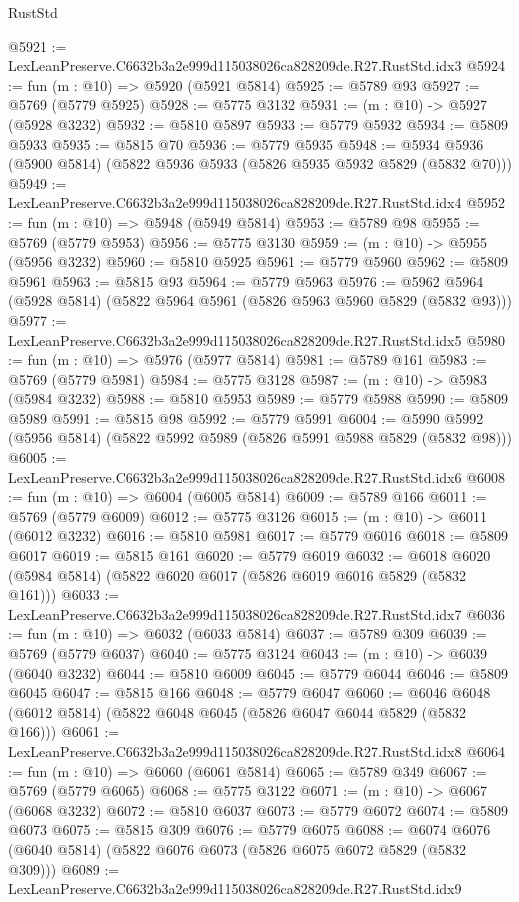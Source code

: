 \begin{lexlean}{RustStd}
\begin{coremodule}
@5921 := LexLeanPreserve.C6632b3a2e999d115038026ca828209de.R27.RustStd.idx3
@5924 := fun (m : @10) => @5920 (@5921 @5814)
@5925 := @5789 @93
@5927 := @5769 (@5779 @5925)
@5928 := @5775 @3132
@5931 := (m : @10) -> @5927 (@5928 @3232)
@5932 := @5810 @5897
@5933 := @5779 @5932
@5934 := @5809 @5933
@5935 := @5815 @70
@5936 := @5779 @5935
@5948 := @5934 @5936 (@5900 @5814) (@5822 @5936 @5933 (@5826 @5935 @5932 @5829 (@5832 @70)))
@5949 := LexLeanPreserve.C6632b3a2e999d115038026ca828209de.R27.RustStd.idx4
@5952 := fun (m : @10) => @5948 (@5949 @5814)
@5953 := @5789 @98
@5955 := @5769 (@5779 @5953)
@5956 := @5775 @3130
@5959 := (m : @10) -> @5955 (@5956 @3232)
@5960 := @5810 @5925
@5961 := @5779 @5960
@5962 := @5809 @5961
@5963 := @5815 @93
@5964 := @5779 @5963
@5976 := @5962 @5964 (@5928 @5814) (@5822 @5964 @5961 (@5826 @5963 @5960 @5829 (@5832 @93)))
@5977 := LexLeanPreserve.C6632b3a2e999d115038026ca828209de.R27.RustStd.idx5
@5980 := fun (m : @10) => @5976 (@5977 @5814)
@5981 := @5789 @161
@5983 := @5769 (@5779 @5981)
@5984 := @5775 @3128
@5987 := (m : @10) -> @5983 (@5984 @3232)
@5988 := @5810 @5953
@5989 := @5779 @5988
@5990 := @5809 @5989
@5991 := @5815 @98
@5992 := @5779 @5991
@6004 := @5990 @5992 (@5956 @5814) (@5822 @5992 @5989 (@5826 @5991 @5988 @5829 (@5832 @98)))
@6005 := LexLeanPreserve.C6632b3a2e999d115038026ca828209de.R27.RustStd.idx6
@6008 := fun (m : @10) => @6004 (@6005 @5814)
@6009 := @5789 @166
@6011 := @5769 (@5779 @6009)
@6012 := @5775 @3126
@6015 := (m : @10) -> @6011 (@6012 @3232)
@6016 := @5810 @5981
@6017 := @5779 @6016
@6018 := @5809 @6017
@6019 := @5815 @161
@6020 := @5779 @6019
@6032 := @6018 @6020 (@5984 @5814) (@5822 @6020 @6017 (@5826 @6019 @6016 @5829 (@5832 @161)))
@6033 := LexLeanPreserve.C6632b3a2e999d115038026ca828209de.R27.RustStd.idx7
@6036 := fun (m : @10) => @6032 (@6033 @5814)
@6037 := @5789 @309
@6039 := @5769 (@5779 @6037)
@6040 := @5775 @3124
@6043 := (m : @10) -> @6039 (@6040 @3232)
@6044 := @5810 @6009
@6045 := @5779 @6044
@6046 := @5809 @6045
@6047 := @5815 @166
@6048 := @5779 @6047
@6060 := @6046 @6048 (@6012 @5814) (@5822 @6048 @6045 (@5826 @6047 @6044 @5829 (@5832 @166)))
@6061 := LexLeanPreserve.C6632b3a2e999d115038026ca828209de.R27.RustStd.idx8
@6064 := fun (m : @10) => @6060 (@6061 @5814)
@6065 := @5789 @349
@6067 := @5769 (@5779 @6065)
@6068 := @5775 @3122
@6071 := (m : @10) -> @6067 (@6068 @3232)
@6072 := @5810 @6037
@6073 := @5779 @6072
@6074 := @5809 @6073
@6075 := @5815 @309
@6076 := @5779 @6075
@6088 := @6074 @6076 (@6040 @5814) (@5822 @6076 @6073 (@5826 @6075 @6072 @5829 (@5832 @309)))
@6089 := LexLeanPreserve.C6632b3a2e999d115038026ca828209de.R27.RustStd.idx9

\end{coremodule}
\end{lexlean}
